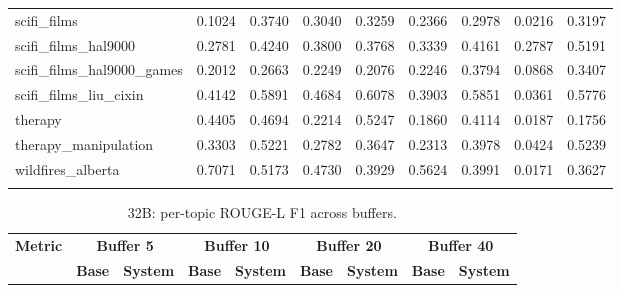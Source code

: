 \begin{landscape}
\begin{longtable}{@{}p{3.8cm}cccccccc@{}}
scifi\_films & 0.1024 & 0.3740 & 0.3040 & 0.3259 & 0.2366 & 0.2978 & 0.0216 & 0.3197 \\
scifi\_films\_hal9000 & 0.2781 & 0.4240 & 0.3800 & 0.3768 & 0.3339 & 0.4161 & 0.2787 & 0.5191 \\
scifi\_films\_hal9000\_games & 0.2012 & 0.2663 & 0.2249 & 0.2076 & 0.2246 & 0.3794 & 0.0868 & 0.3407 \\
scifi\_films\_liu\_cixin & 0.4142 & 0.5891 & 0.4684 & 0.6078 & 0.3903 & 0.5851 & 0.0361 & 0.5776 \\
therapy & 0.4405 & 0.4694 & 0.2214 & 0.5247 & 0.1860 & 0.4114 & 0.0187 & 0.1756 \\
therapy\_manipulation & 0.3303 & 0.5221 & 0.2782 & 0.3647 & 0.2313 & 0.3978 & 0.0424 & 0.5239 \\
wildfires\_alberta & 0.7071 & 0.5173 & 0.4730 & 0.3929 & 0.5624 & 0.3991 & 0.0171 & 0.3627 \\
\botrule
\end{longtable}
\begin{longtable}{@{}p{3.8cm}cccccccc@{}}
\caption{32B: per-topic ROUGE-L F1 across buffers.}\label{tab:app_32b_rougel_topics}\\

\toprule
\textbf{Metric} & \multicolumn{2}{c}{\textbf{Buffer 5}} & \multicolumn{2}{c}{\textbf{Buffer 10}} & \multicolumn{2}{c}{\textbf{Buffer 20}} & \multicolumn{2}{c}{\textbf{Buffer 40}} \\
\cmidrule(lr){2-3}\cmidrule(lr){4-5}\cmidrule(lr){6-7}\cmidrule(lr){8-9}
 & \textbf{Base} & \textbf{System} & \textbf{Base} & \textbf{System} & \textbf{Base} & \textbf{System} & \textbf{Base} & \textbf{System} \\
\midrule
\endfirsthead


\end{longtable}
\end{landscape}
